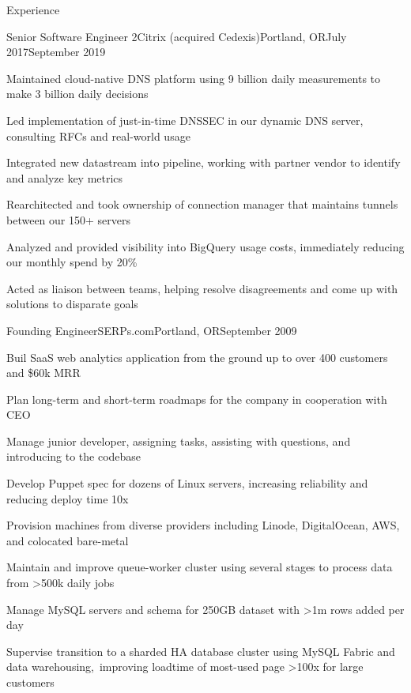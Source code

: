\documentclass[letterpaper,12pt]{article}
\let\pt\pasttense
\begin{document}
\begin{paracol}{2}
\begin{res_section}{Experience}
  \begin{res_experienceitem}{Senior Software Engineer 2}{Citrix (acquired Cedexis)}{Portland, OR}{July 2017}{September 2019}
  \item Maintained cloud-native DNS platform using 9 billion daily measurements to make 3 billion daily decisions
  \item Led implementation of just-in-time DNSSEC in our dynamic DNS server, consulting RFCs and real-world usage
  \item Integrated new datastream into pipeline, working with partner vendor to identify and analyze key metrics
  \item Rearchitected and took ownership of connection manager that maintains tunnels between our 150+ servers
  \item Analyzed and provided visibility into BigQuery usage costs, immediately reducing our monthly spend by 20\%
  \item Acted as liaison between teams, helping resolve disagreements and come up with solutions to disparate goals
\end{res_experienceitem}
\begin{res_experienceitem}{Founding Engineer}{SERPs.com}{Portland, OR}{September 2009}{{\pt[Present]{March 2017}}}
  \item Buil\pt[d]{t} SaaS web analytics application from the ground up to over 400 customers and \$60k MRR
  \item Plan\pt{ned} long-term and short-term roadmaps for the company in cooperation with CEO
  \item Manage\pt{d} junior developer, assigning tasks, assisting with questions, and introducing to the codebase
  \item Develop\pt{ed} Puppet spec for dozens of Linux servers, increasing reliability and reducing deploy time 10x
  \item Provision\pt{ed} machines from diverse providers including Linode, DigitalOcean, AWS, and colocated bare-metal
  \item Maintain\pt{ed} and improve\pt{d} queue-worker cluster using several stages to process data from \textgreater500k daily jobs
  \item Manage\pt{d} MySQL servers and schema for 250GB dataset with \textgreater1m rows added per day
  \item Supervise\pt{d} transition to a sharded HA database cluster using MySQL Fabric and data warehousing,\
        improving loadtime of most-used page \textgreater100x for large customers

\end{res_experienceitem}
\end{res_section}
\end{paracol}
\end{document}
